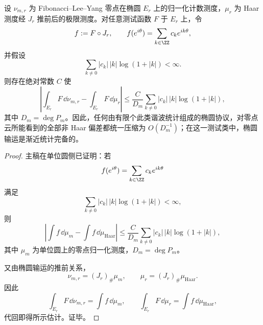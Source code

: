 \begin{theorem}[椭圆输运零点云的谐波协议完备性]\label{thm:conclusion-elliptic-transport-zero-cloud-harmonic-protocol-completeness}
设 \(\nu_{m,r}\) 为 Fibonacci--Lee--Yang 零点在椭圆 \(E_r\) 上的归一化计数测度，\(\mu_r\) 为 Haar 测度经 \(J_r\) 推前后的极限测度。对任意测试函数 \(F\) 于 \(E_r\) 上，令
\[
f:=F\circ J_r,\qquad
f(e^{i\theta})=\sum_{k\in\ZZ}c_k e^{ik\theta},
\]
并假设
\[
\sum_{k\neq 0}|c_k|\,|k|\log(1+|k|)<\infty.
\]
则存在绝对常数 \(C\) 使
\[
\left|\int_{E_r}F\,\dd\nu_{m,r}-\int_{E_r}F\,\dd\mu_r\right|
\le
\frac{C}{D_m}\sum_{k\neq 0}|c_k|\,|k|\log(1+|k|),
\]
其中 \(D_m=\deg P_m\)。因此，任何由有限个此类谐波统计组成的椭圆协议，对零点云所能看到的全部非 Haar 偏差都统一压缩为 \(O(D_m^{-1})\)；在这一测试类中，椭圆输运是渐近统计完备的。
\end{theorem}
\begin{proof}
主稿在单位圆侧已证明：若
\[
f(e^{i\theta})=\sum_{k\in\ZZ}c_k e^{ik\theta}
\]
满足
\[
\sum_{k\neq 0}|c_k|\,|k|\log(1+|k|)<\infty,
\]
则
\[
\left|\int f\,\dd\mu_m-\int f\,\dd\mu_{\mathrm{Haar}}\right|
\le
\frac{C}{D_m}\sum_{k\neq 0}|c_k|\,|k|\log(1+|k|),
\]
其中 \(\mu_m\) 为单位圆上的零点归一化测度，\(D_m=\deg P_m\)。

又由椭圆输运的推前关系，
\[
\nu_{m,r}=(J_r)_\#\mu_m,
\qquad
\mu_r=(J_r)_\#\mu_{\mathrm{Haar}}.
\]
因此
\[
\int_{E_r}F\,\dd\nu_{m,r}=\int f\,\dd\mu_m,
\qquad
\int_{E_r}F\,\dd\mu_r=\int f\,\dd\mu_{\mathrm{Haar}},
\]
代回即得所示估计。证毕。
\end{proof}

